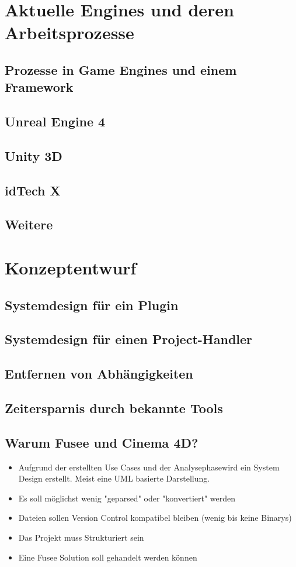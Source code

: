 \documentclass[pagesize, paper=a4, fontsize=12pt,titlepage=true, headings=small, headnosepline, abstractoff, liststotoc, nochapterprefix, plainheadsepline, twoside]{scrreprt}
\begin{document}
\section{Aktuelle Engines und deren Arbeitsprozesse}
\subsection{Prozesse in Game Engines und einem Framework}
\subsection{Unreal Engine 4}
\subsection{Unity 3D}
\subsection{idTech X}
\subsection{Weitere}

\section{Konzeptentwurf}
\subsection{Systemdesign für ein Plugin}
\subsection{Systemdesign für einen Project-Handler}
\subsection{Entfernen von Abhängigkeiten}
\subsection{Zeitersparnis durch bekannte Tools}
\subsection{Warum Fusee und Cinema 4D?}

\begin{itemize}
\item Aufgrund der erstellten Use Cases und der Analysephasewird ein System Design erstellt. Meist eine UML basierte Darstellung.
\item Es soll möglichst wenig "geparsed" oder "konvertiert" werden
\item Dateien sollen Version Control kompatibel bleiben (wenig bis keine Binarys)
\item Das Projekt muss Strukturiert sein
\item Eine Fusee Solution soll gehandelt werden können
\end{itemize}
\end{document}
